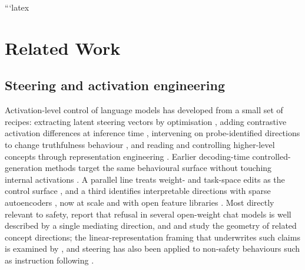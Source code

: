 ```latex
\section{Related Work}

\subsection{Steering and activation engineering}

Activation-level control of language models has developed from a small set of
recipes: extracting latent steering vectors by optimisation
\citep{subramani2022extracting}, adding contrastive activation differences at
inference time \citep{turner2023activation,rimsky2024steering}, intervening on
probe-identified directions to change truthfulness behaviour
\citep{li2023inference}, and reading and controlling higher-level concepts
through representation engineering \citep{zou2023representation}. Earlier
decoding-time controlled-generation methods target the same behavioural surface
without touching internal activations \citep{dathathri2020plug,liu2021dexperts}.
A parallel line treats weight- and task-space edits as the control surface
\citep{ilharco2023task}, and a third identifies interpretable directions with
sparse autoencoders
\citep{cunningham2023sparse,bricken2023monosemanticity,templeton2024scaling},
now at scale and with open feature libraries
\citep{gao2025scaling,lieberum2024gemmascope}. Most directly relevant to safety,
\citet{arditi2024refusal} report that refusal in several open-weight chat models
is well described by a single mediating direction, and
\citet{marks2024geometry} and \citet{vonrutte2024language} study the geometry of
related concept directions; the linear-representation framing that underwrites
such claims is examined by \citet{park2024linear}, and steering has also been
applied to non-safety behaviours such as instruction following
\citep{stolfo2025improving}.

